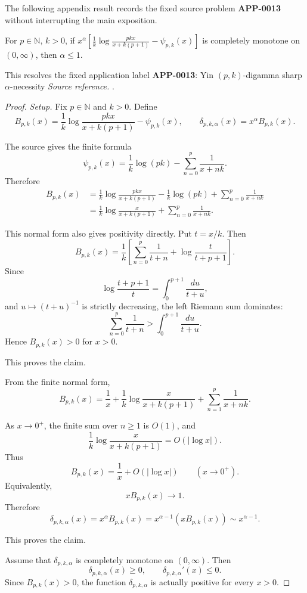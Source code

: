 The following appendix result records the fixed source problem \textbf{APP-0013} without interrupting the main exposition.
\begin{corollary}
\label{res:yin-pk-digamma-alpha-necessity}
For \(p\in\mathbb N\), \(k>0\), if \(x^\alpha\left[\frac1k\log\frac{pkx}{x+k(p+1)}-\psi_{p,k}(x)\right]\) is completely monotone on \((0,\infty)\), then \(\alpha\le1\).

This resolves the fixed application label \textbf{APP-0013}: Yin \((p,k)\)-digamma sharp \(\alpha\)-necessity
\emph{Source reference.} \cite{app-app-0013-source}.
\end{corollary}
\begin{proof}
\emph{Setup.}
Fix \(p\in\mathbb N\) and \(k>0\). Define
\[
B_{p,k}(x)=
\frac1k\log\frac{pkx}{x+k(p+1)}-\psi_{p,k}(x),
\qquad
\delta_{p,k,\alpha}(x)=x^\alpha B_{p,k}(x).
\]

The source gives the finite formula
\[
\psi_{p,k}(x)=\frac1k\log(pk)-\sum_{n=0}^p\frac1{x+nk}.
\]
Therefore
\[
\begin{aligned}
B_{p,k}(x)
&=
\frac1k\log\frac{pkx}{x+k(p+1)}
-\frac1k\log(pk)
+\sum_{n=0}^p\frac1{x+nk}  \\
&=
\frac1k\log\frac{x}{x+k(p+1)}
+\sum_{n=0}^p\frac1{x+nk}.
\end{aligned}
\]

This normal form also gives positivity directly. Put \(t=x/k\). Then
\[
B_{p,k}(x)
=\frac1k\left[
\sum_{n=0}^p\frac1{t+n}
+\log\frac{t}{t+p+1}
\right].
\]
Since
\[
\log\frac{t+p+1}{t}=\int_0^{p+1}\frac{du}{t+u},
\]
and \(u\mapsto(t+u)^{-1}\) is strictly decreasing, the left Riemann sum dominates:
\[
\sum_{n=0}^p\frac1{t+n}
>
\int_0^{p+1}\frac{du}{t+u}.
\]
Hence \(B_{p,k}(x)>0\) for \(x>0\).

This proves the claim.

From the finite normal form,
\[
B_{p,k}(x)
=\frac1x
+\frac1k\log\frac{x}{x+k(p+1)}
+\sum_{n=1}^p\frac1{x+nk}.
\]

As \(x\to0^+\), the finite sum over \(n\ge1\) is \(O(1)\), and
\[
\frac1k\log\frac{x}{x+k(p+1)}=O(|\log x|).
\]
Thus
\[
B_{p,k}(x)=\frac1x+O(|\log x|)
\qquad (x\to0^+).
\]
Equivalently,
\[
xB_{p,k}(x)\to1.
\]
Therefore
\[
\delta_{p,k,\alpha}(x)
=x^\alpha B_{p,k}(x)
=x^{\alpha-1}(xB_{p,k}(x))
\sim x^{\alpha-1}.
\]

This proves the claim.

Assume that \(\delta_{p,k,\alpha}\) is completely monotone on \((0,\infty)\). Then
\[
\delta_{p,k,\alpha}(x)\ge0,\qquad
\delta_{p,k,\alpha}'(x)\le0.
\]
Since \(B_{p,k}(x)>0\), the function \(\delta_{p,k,\alpha}\) is actually positive for every \(x>0\).


\end{proof}
